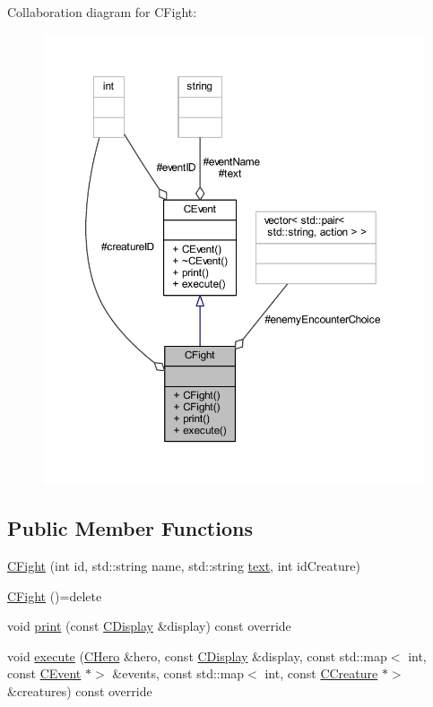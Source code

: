 Collaboration diagram for C\+Fight\+:\nopagebreak
\begin{figure}[H]
\begin{center}
\leavevmode
\includegraphics[width=350pt]{class_c_fight__coll__graph}
\end{center}
\end{figure}
\subsection*{Public Member Functions}
\begin{DoxyCompactItemize}
\item 
\mbox{\hyperlink{class_c_fight_ab5f2b154ef7919c84728ffb2a20843d3}{C\+Fight}} (int id, std\+::string name, std\+::string \mbox{\hyperlink{class_c_event_a0126916c81d39bf5a4bcd18da90b7c61}{text}}, int id\+Creature)
\item 
\mbox{\hyperlink{class_c_fight_a6ab8b9fa1fbc6e2a3fae840f738b9143}{C\+Fight}} ()=delete
\item 
void \mbox{\hyperlink{class_c_fight_a70c350b815744b481134b4d3ac0f61bb}{print}} (const \mbox{\hyperlink{class_c_display}{C\+Display}} \&display) const override
\item 
void \mbox{\hyperlink{class_c_fight_ac820b62e70990ddc90ecb959f4497f8f}{execute}} (\mbox{\hyperlink{class_c_hero}{C\+Hero}} \&hero, const \mbox{\hyperlink{class_c_display}{C\+Display}} \&display, const std\+::map$<$ int, const \mbox{\hyperlink{class_c_event}{C\+Event}} $\ast$$>$ \&events, const std\+::map$<$ int, const \mbox{\hyperlink{class_c_creature}{C\+Creature}} $\ast$$>$ \&creatures) const override
\end{DoxyCompactItemize}
